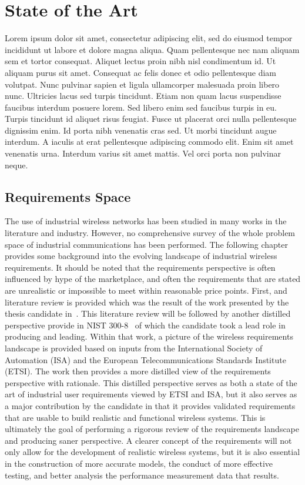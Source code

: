 
\chapter{State of the Art}\label{chapter:soa}

\chapterintro*

Lorem ipsum dolor sit amet, consectetur adipiscing elit, sed do eiusmod tempor incididunt ut labore et dolore magna aliqua. Quam pellentesque nec nam aliquam sem et tortor consequat. Aliquet lectus proin nibh nisl condimentum id. Ut aliquam purus sit amet. Consequat ac felis donec et odio pellentesque diam volutpat. Nunc pulvinar sapien et ligula ullamcorper malesuada proin libero nunc. Ultricies lacus sed turpis tincidunt. Etiam non quam lacus suspendisse faucibus interdum posuere lorem. Sed libero enim sed faucibus turpis in eu. Turpis tincidunt id aliquet risus feugiat. Fusce ut placerat orci nulla pellentesque dignissim enim. Id porta nibh venenatis cras sed. Ut morbi tincidunt augue interdum. A iaculis at erat pellentesque adipiscing commodo elit. Enim sit amet venenatis urna. Interdum varius sit amet mattis. Vel orci porta non pulvinar neque.



\section{Requirements Space}

The use of industrial wireless networks has been studied in many works in the literature and industry. However, no comprehensive survey of the whole problem space of industrial communications has been performed.   The following chapter provides some background into the evolving landscape of industrial wireless requirements.  It should be noted that the requirements perspective is often influenced by hype of the marketplace, and often the requirements that are stated are unrealistic or impossible to meet within reasonable price points.  First, and literature review is provided which was the result of the work presented by the thesis candidate in~\cite{CandellRW2017}.  This literature review will be followed by another distilled perspective provide in NIST 300-8~\cite{Montgomery2019} of which the candidate took a lead role in producing and leading.  Within that work, a picture of the wireless requirements landscape is provided based on inputs from the International Society of Automation (ISA) and the European Telecommunications Standards Institute (ETSI).  The work then provides a more distilled view of the requirements perspective with rationale.  This distilled perspective serves as both a state of the art of industrial user requirements viewed by ETSI and ISA, but it also serves as a major contribution by the candidate in that it provides validated requirements that are usable to build realistic and functional wireless systems.  This is ultimately the goal of performing a rigorous review of the requirements landscape and producing saner perspective.  A clearer concept of the requirements will not only allow for the development of realistic wireless systems, but it is also essential in the construction of more accurate models, the conduct of more effective testing, and better analysis the performance measurement data that results.


